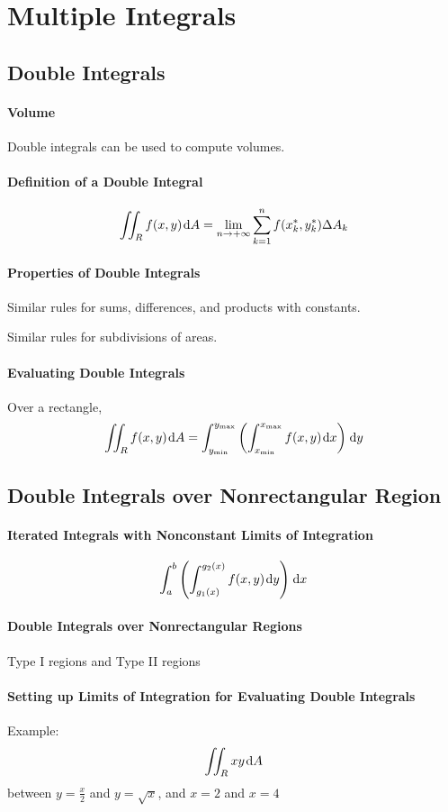 \section{Multiple Integrals}
\subsection{Double Integrals}
\paragraph{Volume}
Double integrals can be used to compute volumes.\par\medskip
\paragraph{Definition of a Double Integral}
$$\iint_R f(x,y)\hskip1pt{\mathrm{d}} A=\lim_{n\to+\infty}\sum_{k=1}^n f(x_k^\ast,y_k^\ast)\Delta A_k$$
\paragraph{Properties of Double Integrals} Similar rules for sums, differences, and products with constants.\par\medskip
Similar rules for subdivisions of areas.\par\medskip
\paragraph{Evaluating Double Integrals} Over a rectangle, $$\iint_Rf(x,y)\hskip1pt{\mathrm{d}} A=\int_{y_\mathrm{min}}^{y_\mathrm{max}}\left(\int_{x_\mathrm{min}}^{x_\mathrm{max}}f(x,y)\hskip1pt{\mathrm{d}} x\right)\hskip1pt{\mathrm{d}} y$$
\subsection{Double Integrals over Nonrectangular Region}
\paragraph{Iterated Integrals with Nonconstant Limits of Integration}
$$\int_a^b\left(\int_{g_1(x)}^{g_2(x)}f(x,y)\hskip1pt{\mathrm{d}} y\right)\hskip1pt{\mathrm{d}} x$$
\paragraph{Double Integrals over Nonrectangular Regions}
Type I regions and Type II regions\par\medskip
\paragraph{Setting up Limits of Integration for Evaluating Double Integrals}\mbox{}\par\medskip
Example:
$$\iint_R xy\hskip1pt{\mathrm{d}} A$$ between $y=\frac{x}{2}$ and $y=\sqrt{x}$, and $x=2$ and $x=4$\par\medskip
